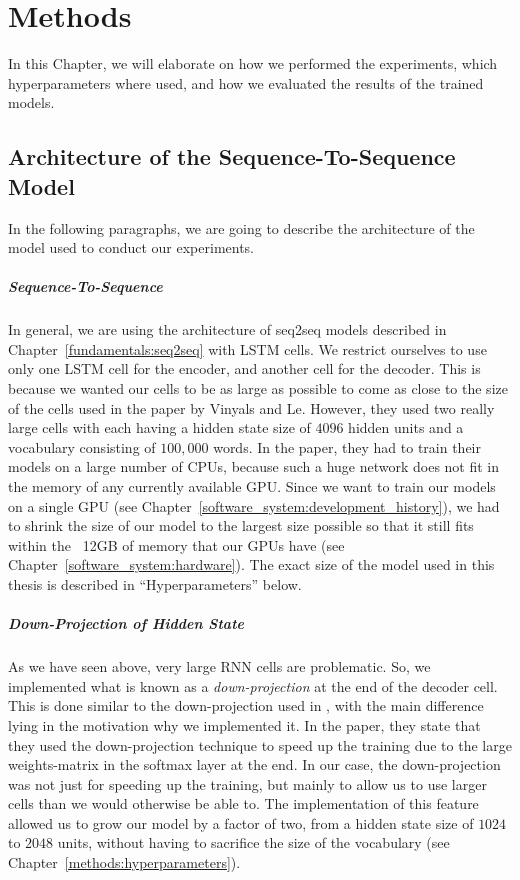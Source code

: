 \chapter{Methods}
\label{methods}
In this Chapter, we will elaborate on how we performed the experiments, which hyperparameters where used, and how we evaluated the results of the trained models.

\section{Architecture of the Sequence-To-Sequence Model}
\label{methods:architecture}
In the following paragraphs, we are going to describe the architecture of the model used to conduct our experiments.

\paragraph{Sequence-To-Sequence} In general, we are using the architecture of seq2seq models described in Chapter~\ref{fundamentals:seq2seq} with LSTM cells. We restrict ourselves to use only one LSTM cell for the encoder, and another cell for the decoder. This is because we wanted our cells to be as large as possible to come as close to the size of the cells used in the paper by Vinyals and Le\cite{Vinyals:2015}. However, they used two really large cells with each having a hidden state size of $4096$ hidden units and a vocabulary consisting of $100,000$ words. In the paper, they had to train their models on a large number of CPUs, because such a huge network does not fit in the memory of any currently available GPU. Since we want to train our models on a single GPU (see Chapter~\ref{software_system:development_history}), we had to shrink the size of our model to the largest size possible so that it still fits within the ~12GB of memory that our GPUs have (see Chapter~\ref{software_system:hardware}). The exact size of the model used in this thesis is described in ``Hyperparameters'' below.

\paragraph{Down-Projection of Hidden State} As we have seen above, very large RNN cells are problematic. So, we implemented what is known as a \emph{down-projection} at the end of the decoder cell. This is done similar to the down-projection used in \cite{Vinyals:2015}, with the main difference lying in the motivation why we implemented it. In the paper, they state that they used the down-projection technique to speed up the training due to the large weights-matrix in the softmax layer at the end. In our case, the down-projection was not just for speeding up the training, but mainly to allow us to use larger cells than we would otherwise be able to. The implementation of this feature allowed us to grow our model by a factor of two, from a hidden state size of $1024$ to $2048$ units, without having to sacrifice the size of the vocabulary (see Chapter~\ref{methods:hyperparameters}).

